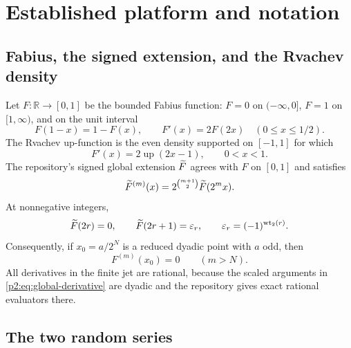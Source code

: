 \documentclass[11pt,oneside]{article}
\numberwithin{equation}{section}
\theoremstyle{definition}
\theoremstyle{remark}
\newcommand{\R}{\mathbb R}
\newcommand{\Up}{\operatorname{up}}
\newcommand{\eps}{\varepsilon}
\begin{document}
\section{Established platform and notation}
\label{p2:sec:platform}

\subsection{Fabius, the signed extension, and the Rvachev density}

Let $F:\R\to[0,1]$ be the bounded Fabius function: $F=0$ on $(-\infty,0]$,
$F=1$ on $[1,\infty)$, and on the unit interval
\begin{equation}
 F(1-x)=1-F(x),\qquad F'(x)=2F(2x)\quad(0\le x\le1/2).
 \label{p2:eq:F-basic}
\end{equation}
The Rvachev up-function is the even density supported on $[-1,1]$ for which
\begin{equation}
 F'(x)=2\Up(2x-1),\qquad 0<x<1.
 \label{p2:eq:Fprime-up}
\end{equation}
The repository's signed global extension $\widetilde F$ agrees with $F$ on $[0,1]$ and satisfies
\begin{equation}
 \widetilde F^{(m)}(x)=2^{\binom{m+1}{2}}\widetilde F(2^m x).
 \label{p2:eq:global-derivative}
\end{equation}
At nonnegative integers,
\begin{equation}
 \GF(2r)=0,\qquad \GF(2r+1)=\eps_r,
 \qquad \eps_r=(-1)^{\wt(r)}.
 \label{p2:eq:integer-global}
\end{equation}
Consequently, if $x_0=a/2^N$ is a reduced dyadic point with $a$ odd, then
\begin{equation}
 F^{(m)}(x_0)=0\qquad(m>N).
 \label{p2:eq:dyadic-vanish}
\end{equation}
All derivatives in the finite jet are rational, because the scaled arguments in
\eqref{p2:eq:global-derivative} are dyadic and the repository gives exact rational evaluators there.

\subsection{The two random series}
\end{document}
